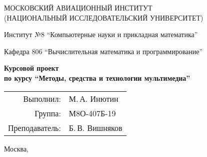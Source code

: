 \begin{titlepage}
    \begin{center}
        \large
        МОСКОВСКИЙ АВИАЦИОННЫЙ ИНСТИТУТ\\ (НАЦИОНАЛЬНЫЙ ИССЛЕДОВАТЕЛЬСКИЙ УНИВЕРСИТЕТ)

        \vspace{20pt}

        Институт №8 \enquote{Компьютерные науки и прикладная математика}

        Кафедра 806 \enquote{Вычислительная математика и программирование}
    \end{center}

    \vspace{60pt}

    \begin{center}
        \bfseries
        \large
        Курсовой проект\\по курсу \enquote{Методы, средства и технологии мультимедиа}

        \vspace{54pt}

    \end{center}

    \vfill

    \begin{flushright}
        \large
        \begin{tabular}{rl}
            Выполнил:      & М.\,А. Инютин   \\
            Группа:        & М8О-407Б-19     \\
            Преподаватель: & Б.\,В. Вишняков \\
        \end{tabular}
    \end{flushright}

    \vspace{92pt}

    \begin{center}
        \large
        Москва, \the\year
    \end{center}
\end{titlepage}

\pagebreak
